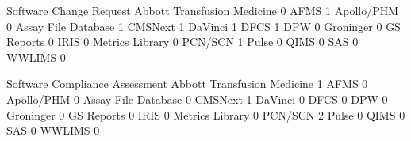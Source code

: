 \documentclass{article}
\begin{document}
\begin{Schunk}
\begin{Soutput}
                              Software Change Request
  Abbott Transfusion Medicine                       0
  AFMS                                              1
  Apollo/PHM                                        0
  Assay File Database                               1
  CMSNext                                           1
  DaVinci                                           1
  DFCS                                              1
  DPW                                               0
  Groninger                                         0
  GS Reports                                        0
  IRIS                                              0
  Metrics Library                                   0
  PCN/SCN                                           1
  Pulse                                             0
  QIMS                                              0
  SAS                                               0
  WWLIMS                                            0
                             
                              Software Compliance Assessment
  Abbott Transfusion Medicine                              1
  AFMS                                                     0
  Apollo/PHM                                               0
  Assay File Database                                      0
  CMSNext                                                  1
  DaVinci                                                  0
  DFCS                                                     0
  DPW                                                      0
  Groninger                                                0
  GS Reports                                               0
  IRIS                                                     0
  Metrics Library                                          0
  PCN/SCN                                                  2
  Pulse                                                    0
  QIMS                                                     0
  SAS                                                      0
  WWLIMS                                                   0
                             

\end{Soutput}
\end{Schunk}
\end{document}
